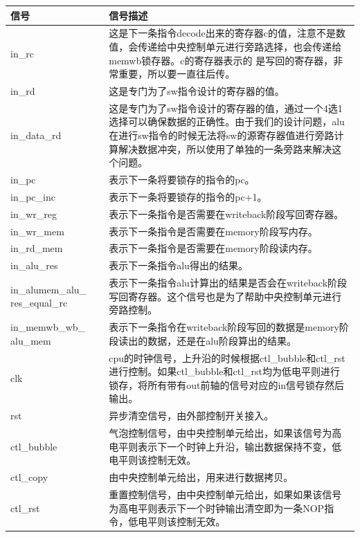 \begin{center}
    \label{table:alumem}
    \begin{longtable}{p{}p{}}
        \toprule
        信号 & 信号描述 \\
        \midrule
        in\_rc &  这是下一条指令decode出来的寄存器c的值，注意不是数值，会传递给中央控制单元进行旁路选择，也会传递给memwb锁存器。c的寄存器表示的
        是写回的寄存器，非常重要，所以要一直往后传。\\
        in\_rd & 这是专门为了sw指令设计的寄存器的值。\\
        in\_data\_rd & 这是专门为了sw指令设计的寄存器的值，通过一个4️选1选择可以确保数据的正确性。由于我们的设计问题，alu在进行sw指令的时候无法将sw的源寄存器值进行旁路计算解决数据冲突，所以使用了单独的一条旁路来解决这个问题。\\
        in\_pc &  表示下一条将要锁存的指令的pc。\\
        in\_pc\_inc &  表示下一条将要锁存的指令的pc+1。\\
        in\_wr\_reg &  表示下一条指令是否需要在writeback阶段写回寄存器。\\
        in\_wr\_mem &  表示下一条指令是否需要在memory阶段写内存。\\
        in\_rd\_mem &  表示下一条指令是否需要在memory阶段读内存。\\
        in\_alu\_res & 表示下一条指令alu得出的结果。\\
        in\_alumem\_alu\_  res\_equal\_rc & 表示下一条指令alu计算出的结果是否会在writeback阶段写回寄存器。这个信号也是为了帮助中央控制单元进行旁路控制。\\
        in\_memwb\_wb\_  alu\_mem & 表示下一条指令在writeback阶段写回的数据是memory阶段读出的数据，还是在alu阶段算出的结果。\\
        clk & cpu的时钟信号，上升沿的时候根据ctl\_bubble和ctl\_rst进行控制。如果ctl\_bubble和ctl\_rst均为低电平则进行锁存，将所有带有out前轴的信号对应的in信号锁存然后输出。\\
        rst & 异步清空信号，由外部控制开关接入。\\
        ctl\_bubble &  气泡控制信号，由中央控制单元给出，如果该信号为高电平则表示下一个时钟上升沿，输出数据保持不变，低电平则该控制无效。\\
        ctl\_copy &  由中央控制单元给出，用来进行数据拷贝。\\
        ctl\_rst &  重置控制信号，由中央控制单元给出，如果如果该信号为高电平则表示下一个时钟输出清空即为一条NOP指令，低电平则该控制无效。\\

\end{longtable}
\end{center}
